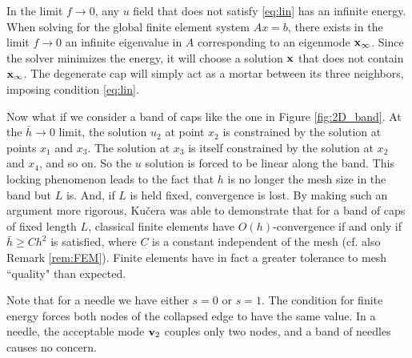 \documentclass{article}
\theoremstyle{remark}
\begin{document}
In the limit $f\rightarrow 0$, any $u$ field that does not satisfy \eqref{eq:lin} has an infinite energy. When solving for the global finite element system $Ax=b$, there exists in the limit $f\rightarrow 0$ an infinite eigenvalue in $A$ corresponding to an eigenmode ${\bf x}_{\infty}$. 
Since the solver minimizes the energy, it will choose a solution ${\bf x}$ that does not contain ${\bf x}_{\infty}$. The degenerate cap will simply act as a mortar between its three neighbors, imposing  condition \eqref{eq:lin}. 

Now what if we consider a band of caps like the one in Figure \ref{fig:2D_band}.
At the $\bar{h} \rightarrow 0$  limit, the solution $u_2$ at point $x_2$ is constrained by the solution at points $x_1$ and $x_3$. The solution at $x_3$ is itself constrained by the solution at $x_2$ and $x_4$, and so on. So the $u$ solution is forced to be linear along the band. This locking phenomenon leads to the fact that $h$ is no longer the mesh size in the band but $L$ is.
And, if $L$ is held fixed, convergence is lost. By making such an argument more rigorous, Ku{\v{c}}era \cite{kuvcera2016necessary} was able to demonstrate that for a band of caps of fixed length $L$, classical finite elements have $O(h)$-convergence if and only if $\bar{h} \ge C h^2$ is satisfied, where $C$ is a constant independent of the mesh (cf. also Remark \ref{rem:FEM}). Finite elements have in fact a greater tolerance to mesh ``quality" than expected. 


Note that for a needle we have either $s=0$ or $s=1$. The condition for finite energy forces both nodes of the collapsed edge to have the same value.
In a needle, the acceptable mode ${\bf v}_2$ couples only two nodes, and a band of needles causes no concern.
\end{document}
